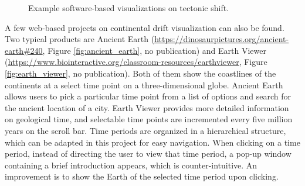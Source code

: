 \documentclass[11pt, a4paper,oneside,chapterprefix=false]{scrbook}
\begin{document}
\newpage
\begin{figure}[h]
	\centering
	\hfill
	\caption{Example software-based visualizations on tectonic shift. }
	\label{fig:software_tectonic}
\end{figure}

A few web-based projects on continental drift visualization can also be found. Two typical products are Ancient Earth (\url{https://dinosaurpictures.org/ancient-earth#240}, Figure \ref{fig:ancient_earth}, no publication) and Earth Viewer (\url{https://www.biointeractive.org/classroom-resources/earthviewer}, Figure \ref{fig:earth_viewer}, no publication). Both of them show the coastlines of the continents at a select time point on a three-dimensional globe. Ancient Earth allows users to pick a particular time point from a list of options and search for the ancient location of a city. Earth Viewer provides more detailed information on geological time, and selectable time points are incremented every five million years on the scroll bar. Time periods are organized in a hierarchical structure, which can be adapted in this project for easy navigation. When clicking on a time period, instead of directing the user to view that time period, a pop-up window containing a brief introduction appears, which is counter-intuitive. An improvement is to show the Earth of the selected time period upon clicking. \\
\end{document}
